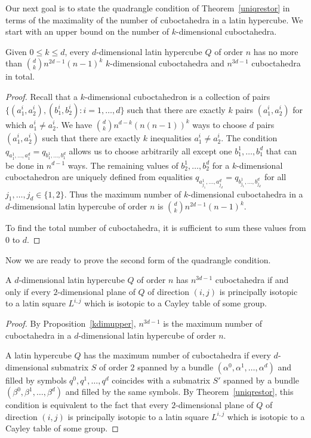 \documentclass[a4paper]{article}
\begin{document}
Our next goal is to  state the quadrangle condition of Theorem~\ref{uniqrestor} in terms of the maximality of the number of cuboctahedra in  a latin hypercube. We start with  an upper bound on the number of $k$-dimensional cuboctahedra. 


\begin{utv} \label{kdimupper}
Given $0 \leq k \leq d$, every  $d$-dimensional latin hypercube $Q$ of order $n$ has no more than ${d \choose k}  n^{2d-1}   (n-1)^{k} $  $k$-dimensional cuboctahedra and $n^{3d-1}$  cuboctahedra  in total. 
\end{utv}

\begin{proof}
Recall that a $k$-dimensional cuboctahedron is a collection of pairs $\{ (a_1^{i}, a_2^{i}), (b_1^{i}, b_2^{i}) : i = 1, \ldots, d \}$ such that there are exactly $k$ pairs $(a_1^{i}, a_2^{i})$ for which $a_1^{i} \neq a_2^{i} $.   We have  ${d \choose k}   n^{d-k}   (n(n-1))^{k}$ ways to choose  $d$ pairs $(a_1^{i}, a_2^{i})$ such that there are exactly   $k$ inequalities   $a_1^{i} \neq  a_2^{i}$.   The condition $q_{a_{1}^1, \ldots, a_{1}^d } = q_{b_{1}^1, \ldots, b_{1}^d } $ allows us to choose arbitrarily all except one  $b_{1}^1, \ldots, b_{1}^d$   that can be done in $n^{d -1}$ ways. The remaining values of $b_{2}^1, \ldots, b_{2}^d$ for a $k$-dimensional cuboctahedron are uniquely defined from equalities $q_{a_{j_1}^1, \ldots, a_{j_d}^d } = q_{b_{j_1}^1, \ldots, b_{j_d}^d } $ for all $j_1, \ldots, j_d \in \{ 1,2\}$. Thus the maximum number of $k$-dimensional cuboctahedra in a $d$-dimensional latin hypercube of order $n$ is ${d \choose k}  n^{2d-1}   (n-1)^{k}  $.

To find the total number of cuboctahedra, it is sufficient to sum these values from $0$ to $d$. 
\end{proof}

Now we are ready to prove the second form of the quadrangle condition. 


\begin{theorem} \label{quadmaxthm}
A $d$-dimensional latin hypercube $Q$ of order $n$ has  $n^{3d-1}$ cuboctahedra if and only if  every $2$-dimensional plane of $Q$ of direction $(i,j)$ is principally isotopic to a latin square $L^{i,j}$ which is isotopic to a Cayley table of some group. 
\end{theorem}

\begin{proof}
By Proposition~\ref{kdimupper}, $n^{3d-1}$  is the maximum number of cuboctahedra in a  $d$-dimensional latin hypercube of order $n$. 

A latin hypercube $Q$ has the maximum number of cuboctahedra if every $d$-dimensional submatrix $S$ of order $2$ spanned by a bundle  $(\alpha^0, \alpha^1, \ldots, \alpha^d)$  and filled by symbols $q^0, q^1, \ldots, q^d$     coincides with a submatrix $S'$  spanned by a  bundle  $(\beta^0, \beta^1, \ldots, \beta^d)$ and  filled by the same symbols. By Theorem~\ref{uniqrestor}, this condition is equivalent to the fact that  every $2$-dimensional plane of $Q$ of direction $(i,j)$ is principally isotopic to a latin square $L^{i,j}$ which is isotopic to a Cayley table of some group. 
\end{proof}
\end{document}

